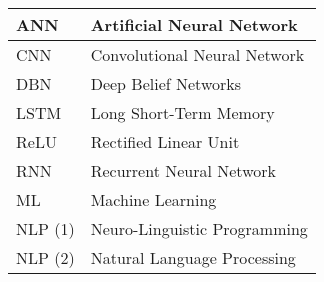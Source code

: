 



\begin{longtable}{ |p{3cm}|p{6cm}|}
		\hline
		ANN   & Artificial Neural Network\\
		\hline
		CNN   & Convolutional Neural Network \\
		\hline
		DBN   & Deep Belief Networks\\
		\hline
		LSTM  & Long Short-Term Memory\\
		\hline
		ReLU  & Rectified Linear Unit\\
		\hline	
		RNN   & Recurrent Neural Network\\
		\hline
		ML 	  &  Machine Learning\\
		\hline
		NLP (1)	  & Neuro-Linguistic Programming\\
		\hline
		NLP (2)   & Natural Language Processing\\
		\hline
\end{longtable}
